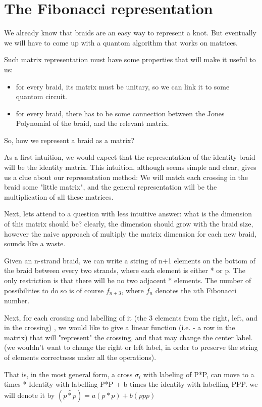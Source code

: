\documentclass{article}
\begin{document}
\section{The Fibonacci representation}
We already know that braids are an easy way to represent a knot. But eventually we will have to come up with a quantom algorithm that works on matrices.

Such matrix representation must have some properties that will make it useful to us:
\begin{itemize}
\item for every braid, its matrix must be unitary, so we can link it to some quantom circuit.
\item for every braid, there has to be some connection between the Jones Polynomial of the braid, and the relevant matrix.
\end{itemize}

 So, how we represent a braid as a matrix?
 
As a first intuition, we would expect that the representation of the identity braid will be the identity matrix. This intuition, although seems simple and clear, gives us a clue about our representation method: We will match each crossing in the braid some "little matrix", and the general representation will be the multiplication of all these matrices.

Next, lets attend to a question with less intuitive answer: what is the dimension of this matrix should be? clearly, the dimension should grow with the braid size, however the naive approach of multiply the matrix dimension for each new braid, sounds like a waste.

 Given an n-strand braid, we can write a string of n+1 elements on the bottom of the braid between every two strands, where each element is either * or p. The only restriction is that there will be no two adjacent * elements. The number of possibilities to do so is of course $f_{n+3}$, where $f_{n}$ denotes the $n$th Fibonacci number.

Next, for each crossing and labelling of it (the 3 elements from the right, left, and in the crossing) , we would like to give a linear function (i.e. - a row in the matrix) that will "represent" the crossing, and that may change the center label. (we wouldn't want to change the right or left label, in order to preserve the string of elements correctness under all the operations).

That is, in the most general form, a cross $\sigma_{i}$ with labeling of P*P, can move to 
a times * Identity with labelling P*P + b times the identity with labelling PPP.
we will denote it by $(p\hat{*}p)=a(p*p)+b(ppp)$
\end{document}

